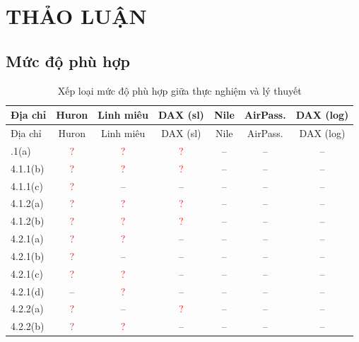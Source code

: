 \clearpage
\section[Thảo luận]{THẢO LUẬN}


\subsection{Mức độ phù hợp}

\begin{longtable}{@{}lcccccc@{}}
\caption{Xếp loại mức độ phù hợp giữa thực nghiệm và lý thuyết}\label{tab:xeploai}\\
\toprule
Địa chỉ & Huron & Linh miêu & DAX (sl) & Nile & AirPass. & DAX (log) \\
\midrule
\endfirsthead
\toprule
Địa chỉ & Huron & Linh miêu & DAX (sl) & Nile & AirPass. & DAX (log) \\
\midrule
\endhead
\bottomrule
\endlastfoot
4.1.1(a) & \textcolor{red}{?} & \textcolor{red}{?} & \textcolor{red}{?} & -- & -- & -- \\
4.1.1(b) & \textcolor{red}{?} & \textcolor{red}{?} & \textcolor{red}{?} & -- & -- & -- \\
4.1.1(c) & \textcolor{red}{?} & -- & -- & -- & -- & -- \\
4.1.2(a) & \textcolor{red}{?} & \textcolor{red}{?} & \textcolor{red}{?} & -- & -- & -- \\
4.1.2(b) & \textcolor{red}{?} & \textcolor{red}{?} & \textcolor{red}{?} & -- & -- & -- \\
4.2.1(a) & \textcolor{red}{?} & \textcolor{red}{?} & -- & -- & -- & -- \\
4.2.1(b) & \textcolor{red}{?} & -- & -- & -- & -- & -- \\
4.2.1(c) & \textcolor{red}{?} & \textcolor{red}{?} & -- & -- & -- & -- \\
4.2.1(d) & -- & \textcolor{red}{?} & -- & -- & -- & -- \\
4.2.2(a) & \textcolor{red}{?} & -- & \textcolor{red}{?} & -- & -- & -- \\
4.2.2(b) & \textcolor{red}{?} & \textcolor{red}{?} & -- & -- & -- & -- \\

\end{longtable}
